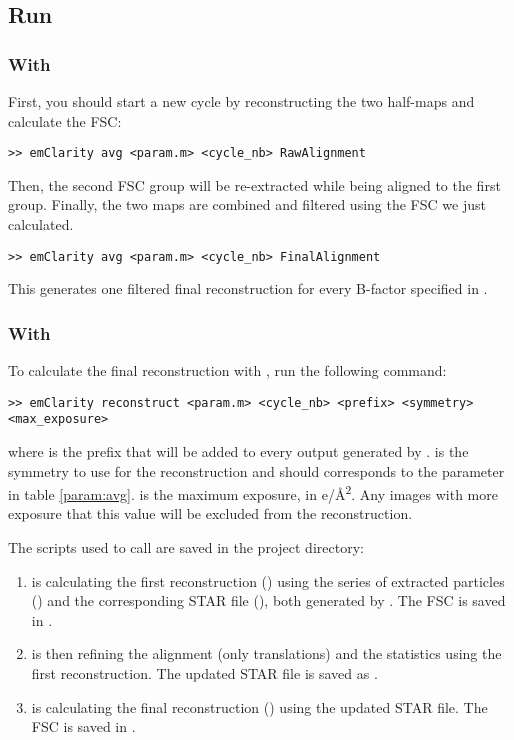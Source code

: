 \subsection{Run}

\subsubsection{With {\emClarity}}

First, you should start a new cycle by reconstructing the two half-maps and calculate the FSC:
\begin{lstlisting}
>> emClarity avg <param.m> <cycle_nb> RawAlignment
\end{lstlisting}
Then, the second FSC group will be re-extracted while being aligned to the first group. Finally, the two maps are combined and filtered using the FSC we just calculated.
\begin{lstlisting}
>> emClarity avg <param.m> <cycle_nb> FinalAlignment
\end{lstlisting}
This generates one filtered final reconstruction for every B-factor specified in .

\subsubsection{With {\cisTEM}}
To calculate the final reconstruction with {\cisTEM}, run the following command:
\begin{lstlisting}
>> emClarity reconstruct <param.m> <cycle_nb> <prefix> <symmetry> <max_exposure>
\end{lstlisting}
where  is the prefix that will be added to every output generated by {\cisTEM}.  is the symmetry to use for the reconstruction and should corresponds to the  parameter in table \ref{param:avg}.  is the maximum exposure, in e/\si{\angstrom}\textsuperscript{2}. Any images with more exposure that this value will be excluded from the reconstruction.

The scripts used to call {\cisTEM} are saved in the project directory:
\begin{enumerate}
    \item {} is calculating the first reconstruction () using the series of extracted particles () and the corresponding STAR file (), both generated by {\emClarity}. The FSC is saved in .
    
    \item {} is then refining the alignment (only translations) and the statistics using the first reconstruction. The updated STAR file is saved as .
    
    \item {} is calculating the final reconstruction () using the updated STAR file. The FSC is saved in .
\end{enumerate}
